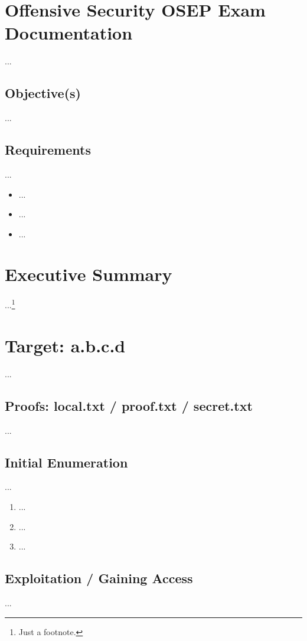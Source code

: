 %
%
%
\section{Offensive Security OSEP Exam Documentation}\label{osep-sec:sec1}
%
...
%
%
%
\subsection{Objective(s)}\label{osep-sec:sec1-obj}
%
...
%
%
%
%
\subsection{Requirements}\label{osep-sec:sec1-req}
%
...

\begin{itemize}
    \item ...
    \item ...
    \item ...
\end{itemize}
%
%
%
\section{Executive Summary}\label{osep-sec:sec2}
%
...\footnote{Just a footnote.}
%
%
%
\section{Target: a.b.c.d}\label{osep-sec:sec3}
%
...
%
%
%
\subsection{Proofs: local.txt / proof.txt / secret.txt}\label{osep-sec:sec3-proofs}
%
...
%
%
%
\subsection{Initial Enumeration}\label{osep-sec:sec3-enum1}
%
...

\begin{enumerate}
    \item ...
    \item ...
    \item ...
\end{enumerate}
%
%
%
\subsection{Exploitation / Gaining Access}\label{osep-sec:sec3-gain}
%
...

